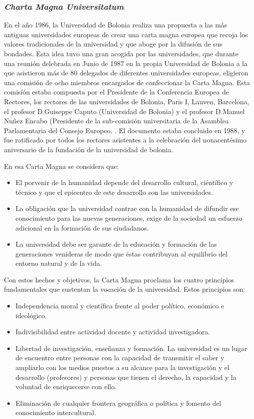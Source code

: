 		\subsubsection{\bfseries \itshape Charta Magna Universitatum}
		En el año 1986, la Universidad de Bolonia realiza una propuesta a las más antiguas universidades europeas de crear una carta magna europea que recoja los valores tradicionales de la universidad y que aboge por la difusión de sus bondades. Esta idea tuvo una gran acogida por las universidades, que durante una	reunión delebrada en Junio de 1987 en la propia Universidad de Bolonia a la que	asistieron más de 80 delegados de diferentes universidades europeas, eligieron una comisión de ocho miembros encargados de confeccionar la Carta Magna. Esta comisíón estaba compuesta por el Presidente de la Conferencia Europea de Rectores, los rectores de las universidades de Bolonia, Paris I, Lauven, Barcelona, el profesor D.Guiseppe Caputo (Universidad de Bolonia) y el profesor D.Manuel Nuñez Encabo (Presidente de la sub-comisión universitaria de la	Asamblea Parlamentaria del Consejo Europeo. \cite{MCO:WEB}. El documento estaba concluido en 1988, y fue ratificado por todos los rectores asistentes a la celebración del nonacentésimo aniversario de la fundación de la universidad de bolonia.

		En esa Carta Magna \cite{UNIBOL:MCU-98} se considera que:
		\begin{itemize}
			\item El porvenir de la humanidad depende del desarrollo cultural, ciéntífico y técnico y que el epicentro de este desarrollo son las universidades.
			\item La obligación que la universidad contrae con la humanidad de difundir ese conocimiento para las nuevas generaciones, exige de la sociedad un esfuerzo adicional en la formación de sus ciudadanos.
			\item La universidad debe ser garante de la educación y formación de las generaciones venideras de modo que éstas contribuyan al equilibrio del entorno natural y de la vida.
		\end{itemize}
	
		Con estos hechos y objetivos, la Carta Magna proclama los cuatro principios fundamentales que sustentan la vocación de la universidad. Estos principios son:
		\begin{itemize}
			\item Independencia moral y científica frente al poder político, económico e ideológico.
			\item Indivisibilidad entre actividad docente y actividad investigadora.
			\item Libertad de investigación, enseñanza y formación. La universidad es un lugar de encuentro entre personas con la capacidad de transmitir el saber y ampliarlo con los medios puestos a su alcance para la investigación y el desarrollo (profesores) y personas que tienen el derecho, la capacidad y la voluntad de enriquecerse con ello.
			\item Eliminación de cualquier frontera geográfica o política y fomento del conocimiento intercultural.
		\end{itemize}
	
